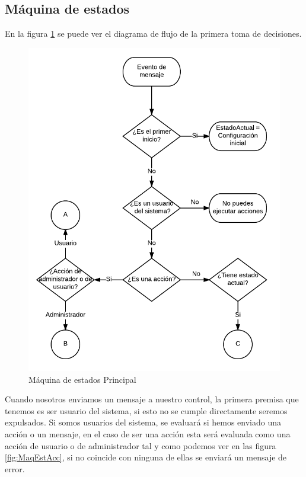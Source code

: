 \documentclass[10pt,journal,compsoc]{IEEEtran}
\begin{document}
\subsection{Máquina de estados}
En la figura \ref{fig:MaqEstPrin} se puede ver el diagrama de flujo de la primera toma de decisiones. 
\begin{figure}[h]
\centering
\includegraphics[scale=0.5]{MaqEstPrin}
\caption{Máquina de estados Principal}
\label{fig:MaqEstPrin}
\end{figure}

Cuando nosotros enviamos un mensaje a nuestro control, la primera premisa que tenemos es ser usuario del sistema, si esto no se cumple directamente seremos expulsados.
Si somos usuarios del sistema, se evaluará si hemos enviado una acción o un mensaje, en el caso de ser una acción esta será evaluada como una acción de usuario o de administrador tal y como podemos ver en las figura \ref{fig:MaqEstAcc}, si no coincide con ninguna de ellas se enviará un mensaje de error.
\end{document}
